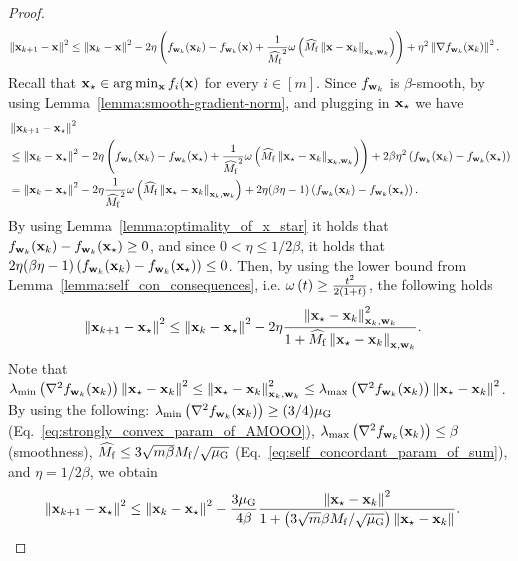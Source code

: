 \begin{proof}
\begin{align}
    \left\Vert{\mathbf{x}}_{k+1}-{\mathbf{x}}\right\Vert^2 &\leq \left\Vert{\mathbf{x}}_k-{\mathbf{x}}\right\Vert^2 - 2\eta\left(f_{{\mathbf{w}}_k}({\mathbf{x}}_k) -f_{{\mathbf{w}}_k}({\mathbf{x}}) + \frac{1}{\widehat{M_{\mathrm{f}}}^2} \omega\left( \widehat{M_{\mathrm{f}} } \left\Vert{\mathbf{x}} - {\mathbf{x}}_k\right\Vert_{{\mathbf{x}}_k,{\mathbf{w}}_k} \right)\right) + \eta^2\left\Vert\nabla f_{{\mathbf{w}}_k}({\mathbf{x}}_k)\right\Vert^2. \label{eq:camoo_dist_from_x}
\end{align}
Recall that ${\mathbf{x}}_\star \in \arg\min_{{\mathbf{x}}} f_i({\mathbf{x}})$ for every $i \in [m]$. Since $f_{{\mathbf{w}}_k}$ is $\beta$-smooth, by using Lemma~\ref{lemma:smooth-gradient-norm}, and plugging in ${\mathbf{x}}_\star$ we have
\begin{align*}
    &\left\Vert{\mathbf{x}}_{k+1}-{\mathbf{x}}_\star\right\Vert^2 \\
    &\leq \left\Vert{\mathbf{x}}_k-{\mathbf{x}}_\star\right\Vert^2 - 2\eta\left(f_{{\mathbf{w}}_k}({\mathbf{x}}_k) -f_{{\mathbf{w}}_k}({\mathbf{x}}_\star) + \frac{1}{\widehat{M_{\mathrm{f}}}^2} \omega\left(\widehat{M_{\mathrm{f}}}\left\Vert{\mathbf{x}}_\star - {\mathbf{x}}_k\right\Vert_{{\mathbf{x}}_k,{\mathbf{w}}_k} \right)\right) + 2 \beta \eta^2 \left(f_{{\mathbf{w}}_k}({\mathbf{x}}_k) -f_{{\mathbf{w}}_k}({\mathbf{x}}_\star)\right) \\
    & =  \left\Vert{\mathbf{x}}_k-{\mathbf{x}}_\star\right\Vert^2 - 2\eta \frac{1}{\widehat{M_{\mathrm{f}}}^2} \omega\left(\widehat{M_{\mathrm{f}}}\left\Vert{\mathbf{x}}_\star - {\mathbf{x}}_k\right\Vert_{{\mathbf{x}}_k,{\mathbf{w}}_k} \right) + 2\eta (\beta \eta - 1) \left(f_{{\mathbf{w}}_k}({\mathbf{x}}_k) -f_{{\mathbf{w}}_k}({\mathbf{x}}_\star)\right).
\end{align*}
By using Lemma~\ref{lemma:optimality_of_x_star} it holds that $f_{{\mathbf{w}}_k}({\mathbf{x}}_k) -f_{{\mathbf{w}}_k}({\mathbf{x}}_\star)\geq 0$, and since $0 < \eta \leq 1/2\beta$, it holds that $2\eta (\beta \eta - 1) \left(f_{{\mathbf{w}}_k}({\mathbf{x}}_k) -f_{{\mathbf{w}}_k}({\mathbf{x}}_\star)\right) \leq 0$. Then, by using the lower bound from Lemma~\ref{lemma:self_con_consequences}, i.e. $\omega\left(t\right) \geq \frac{t^2}{2\left(1+t\right)}$, the following holds
\begin{align*}
    \left\Vert{\mathbf{x}}_{k+1}-{\mathbf{x}}_\star\right\Vert^2 &\leq \left\Vert{\mathbf{x}}_k-{\mathbf{x}}_\star\right\Vert^2 -2\eta \frac{\left\Vert{\mathbf{x}}_\star - {\mathbf{x}}_k\right\Vert_{{\mathbf{x}}_k,{\mathbf{w}}_k}^2}{1+\widehat{M_{\mathrm{f}}}\left\Vert{\mathbf{x}}_\star - {\mathbf{x}}_k\right\Vert_{{\mathbf{x}},{\mathbf{w}}_k}}.
\end{align*}
Note that $\lambda_{\min}\left(\nabla^2 f_{{\mathbf{w}}_k}({\mathbf{x}}_k)\right) \left\Vert{\mathbf{x}}_\star - {\mathbf{x}}_k\right\Vert^2 \leq \left\Vert{\mathbf{x}}_\star - {\mathbf{x}}_k\right\Vert_{{\mathbf{x}}_k,{\mathbf{w}}_k}^2 \leq \lambda_{\max}\left(\nabla^2 f_{{\mathbf{w}}_k}({\mathbf{x}}_k)\right) \left\Vert{\mathbf{x}}_\star - {\mathbf{x}}_k\right\Vert^2$. By using the following: $\lambda_{\min}\left(\nabla^2 f_{{\mathbf{w}}_k}({\mathbf{x}}_k)\right) \geq (3/4){\mu_{\mathrm{G}}}$ (Eq.~\eqref{eq:strongly_convex_param_of_AMOOO}), $\lambda_{\max}\left(\nabla^2 f_{{\mathbf{w}}_k}({\mathbf{x}}_k)\right) \leq \beta$ (smoothness), $\widehat{M_{\mathrm{f}}} \leq 3\sqrt{m\beta}M_{\mathrm{f}} /\sqrt{{\mu_{\mathrm{G}}}}$ (Eq.~\eqref{eq:self_concordant_param_of_sum}), and $\eta = 1/2\beta$, we obtain
\begin{align*}
    \enorm{\x_{k+1}-\x_\star}^2 &\leq \enorm{\x_k-\x_\star}^2 -\frac{3 \muglobal}{4 \beta} \frac{\enorm{\x_\star - \x_k}^2}{1+\brac{3\sqrt{m}\beta M_{\mathrm{f}}/\sqrt{\muglobal}}\enorm{\x_\star - \x_k}}.

\end{align*}
\end{proof}
